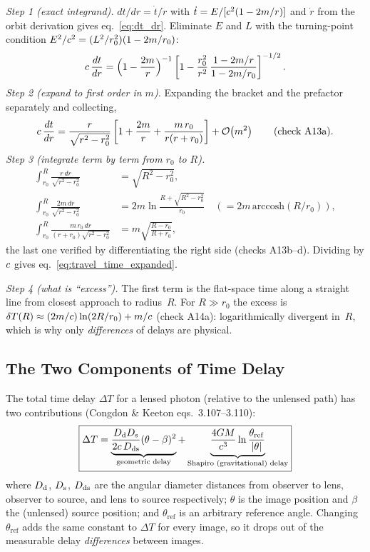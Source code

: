 \begin{derivation}
\textit{Step 1 (exact integrand).}  $dt/dr = \dot t/\dot r$ with
$\dot t = E/[c^2(1-2m/r)]$ and $\dot r$ from the orbit derivation
gives eq.~\eqref{eq:dt_dr}.  Eliminate $E$ and $L$ with the turning-point
condition $E^2/c^2 = (L^2/r_0^2)(1-2m/r_0)$:
\[
    c\,\frac{dt}{dr} = \Bigl(1 - \frac{2m}{r}\Bigr)^{-1}
    \left[1 - \frac{r_0^2}{r^2}\,\frac{1-2m/r}{1-2m/r_0}\right]^{-1/2}.
\]
\textit{Step 2 (expand to first order in $m$).}  Expanding the bracket and the
prefactor separately and collecting,
\[
    c\,\frac{dt}{dr} = \frac{r}{\sqrt{r^2-r_0^2}}
    \left[1 + \frac{2m}{r} + \frac{m\,r_0}{r(r+r_0)}\right] + \mathcal{O}\!\left(m^2\right)
    \qquad (\text{check A13a}).
\]
\textit{Step 3 (integrate term by term from $r_0$ to $R$).}
\begin{align*}
    \int_{r_0}^{R}\frac{r\,dr}{\sqrt{r^2-r_0^2}} &= \sqrt{R^2-r_0^2},\\
    \int_{r_0}^{R}\frac{2m\,dr}{\sqrt{r^2-r_0^2}} &=
      2m\ln\frac{R+\sqrt{R^2-r_0^2}}{r_0} \quad(= 2m\,\mathrm{arccosh}(R/r_0)),\\
    \int_{r_0}^{R}\frac{m\,r_0\,dr}{(r+r_0)\sqrt{r^2-r_0^2}} &=
      m\sqrt{\frac{R-r_0}{R+r_0}} ,
\end{align*}
the last one verified by differentiating the right side (checks A13b--d).
Dividing by $c$ gives eq.~\eqref{eq:travel_time_expanded}.

\textit{Step 4 (what is ``excess'').}  The first term is the flat-space time
along a straight line from closest approach to radius~$R$.  For $R \gg r_0$
the excess is
$\delta T(R) \approx (2m/c)\ln(2R/r_0) + m/c$
(check A14a): logarithmically divergent in~$R$, which is why only
\emph{differences} of delays are physical.
\end{derivation}
\subsection{The Two Components of Time Delay}
\label{sec:delay_components}

The total time delay $\Delta T$ for a lensed photon (relative to the
unlensed path) has two contributions
(Congdon \& Keeton eqs.~3.107--3.110):
\begin{equation}
    \boxed{
    \Delta T = \underbrace{\frac{D_{\mathrm{d}} D_{\mathrm{s}}}{2c\,D_{\mathrm{ds}}}
    (\theta - \beta)^2}_{\text{geometric delay}}
    + \underbrace{\frac{4G M}{c^3}
    \ln\frac{\theta_{\mathrm{ref}}}{|\theta|}}_{\text{Shapiro (gravitational) delay}}
    }
    \label{eq:time_delay_total}
\end{equation}
where $D_{\mathrm{d}}$, $D_{\mathrm{s}}$, $D_{\mathrm{ds}}$ are the angular diameter distances from
observer to lens, observer to source, and lens to source respectively;
$\theta$ is the image position and $\beta$ the (unlensed) source position;
and $\theta_{\mathrm{ref}}$ is an arbitrary reference angle.  Changing
$\theta_{\mathrm{ref}}$ adds the same constant to $\Delta T$ for every
image, so it drops out of the measurable delay \emph{differences}
between images.


